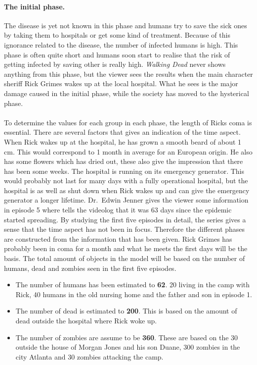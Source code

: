 \documentclass[%
twoside,                 %
final,                   %
10pt]{article}
\begin{document}
\paragraph{The initial phase.}
The disease is yet not known in this phase and humans try to save the sick ones by taking them to hospitals or get some kind of treatment. Because of this ignorance related to the disease, the number of infected humans is high. This phase is often quite short and humans soon start to realise that the risk of getting infected by saving other is really high. \emph{Walking Dead} never shows anything from this phase, but the viewer sees the results when the main character sheriff Rick Grimes wakes up at the local hospital. What he sees is the major damage caused in the initial phase, while the society has moved to the hysterical phase.
\\
\\
To determine the values for each group in each phase, the length of Ricks coma is essential. There are several factors that gives an indication of the time aspect. When Rick wakes up at the hospital, he has grown a smooth beard of about 1 cm. This would correspond to 1 month in average for an European origin. He also has some flowers which has dried out, these also give the impression that there has been some weeks. The hospital is running on its emergency generator. This would probably not last for many days with a fully operational hospital, but the hospital is as well as shut down when Rick wakes up and can give the emergency generator a longer lifetime. Dr.~Edwin Jenner gives the viewer some information in episode 5 where tells the videolog that it was 63 days since the epidemic started spreading. By studying the first five episodes in detail, the series gives a sense that the time aspect has not been in focus. Therefore the different phases are constructed from the information that has been given. Rick Grimes has probably been in coma for a month and what he meets the first days will be the basis. The total amount of objects in the model will be based on the number of humans, dead and zombies seen in the first five episodes. 
\begin{itemize}
 \item The number of humans has been estimated to \textbf{62}. 20 living in the camp with Rick, 40 humans in the old nursing home and the father and son in episode 1. 

 \item The number of dead is estimated to \textbf{200}. This is based on the amount of dead outside the hospital where Rick woke up. 

 \item The number of zombies are assume to be \textbf{360}. These are based on the 30 outside the house of Morgan Jones and his son Duane, 300 zombies in the city Atlanta and 30 zombies attacking the camp. 
\end{itemize}
\end{document}
